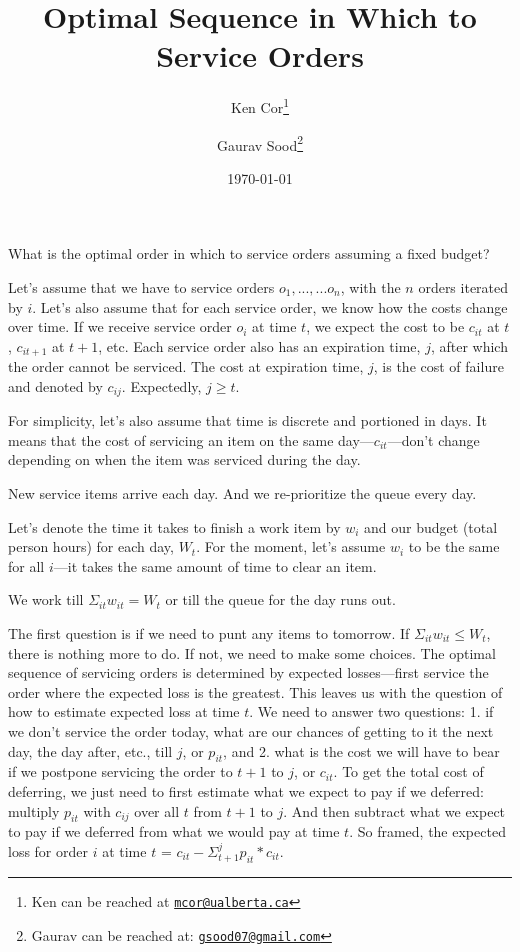 \documentclass[12pt, letterpaper]{article}
\title{\Large{Optimal Sequence in Which to Service Orders}}
\author{Ken Cor\thanks{Ken can be reached at \href{mailto:mcor@ualberta.ca}{\footnotesize{\texttt{mcor@ualberta.ca}}}} \and Gaurav Sood\thanks{Gaurav can be reached at: \href{mailto:gsood07@gmail.com}{\footnotesize{\texttt{gsood07@gmail.com}}}}\vspace{.5cm}}
\date{\vspace{.5cm}\normalsize{\today}}
\begin{document}
\maketitle

\begin{comment}

setwd(paste0(googledrivedir, "/kenny_g/profit_max_staffing/"))
tools::texi2dvi("optimal_sequence.tex", pdf = TRUE, clean = TRUE) 
setwd(googledrivedir)

\end{comment}

\doublespacing

What is the optimal order in which to service orders assuming a fixed budget?

Let's assume that we have to service orders $o_1,...,...o_n$, with the $n$ orders iterated by $i$. Let's also assume that for each service order, we know how the costs change over time. If we receive service order $o_i$ at time $t$, we expect the cost to be $c_{it}$ at $t$, $c_{it+1}$ at $t+1$, etc. Each service order also has an expiration time, $j$, after which the order cannot be serviced. The cost at expiration time, $j$, is the cost of failure and denoted by $c_{ij}$. Expectedly, $j \geq t$.

For simplicity, let's also assume that time is discrete and portioned in days. It means that the cost of servicing an item on the same day---$c_{it}$---don't change depending on when the item was serviced during the day.

New service items arrive each day. And we re-prioritize the queue every day.

Let's denote the time it takes to finish a work item by $w_i$ and our budget (total person hours) for each day, $W_t$. For the moment, let's assume $w_i$ to be the same for all $i$---it takes the same amount of time to clear an item.

We work till $\Sigma_{it} w_{it} = W_t$ or till the queue for the day runs out. 

The first question is if we need to punt any items to tomorrow. If $\Sigma_{it} w_{it} \leq W_t$, there is nothing more to do. If not, we need to make some choices. The optimal sequence of servicing orders is determined by expected losses---first service the order where the expected loss is the greatest. This leaves us with the question of how to estimate expected loss at time $t$. We need to answer two questions: 1. if we don't service the order today, what are our chances of getting to it the next day, the day after, etc., till $j$, or $p_{it}$, and 2. what is the cost we will have to bear if we postpone servicing the order to $t+1$ to $j$, or $c_{it}$. To get the total cost of deferring, we just need to first estimate what we expect to pay if we deferred: multiply $p_{it}$ with $c_{ij}$ over all $t$ from $t+1$ to $j$. And then subtract what we expect to pay if we deferred from what we would pay at time $t$. So framed, the expected loss for order $i$ at time $t$ = $c_{it} - \Sigma_{t+1}^{j} p_{it} * c_{it}$.
\end{document}
